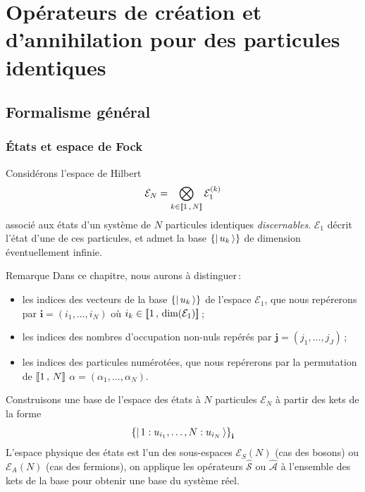 \section{Opérateurs de création et d’annihilation pour des particules identiques}

    \subsection{Formalisme général}

        

        \subsubsection{États et espace de Fock}

        Considérons l’espace de Hilbert 
        \[ \mathcal{E}_N = \bigotimes_{k \in \left[\!\left[ 1 \, , \, N \right]\!\right]} \mathcal{E}_1^{(k)} \]
        associé aux états d’un système de $N$ particules identiques \textit{discernables}. $\mathcal{E}_1$ décrit l’état d’une de ces particules, et admet la base $\left\{\left| \, u_k \, \right>\right\}$ de dimension éventuellement infinie.

        \begin{omed}{Remarque}
            Dans ce chapitre, nous aurons à distinguer :
            \begin{itemize}
                \item les indices des vecteurs de la base $\left\{\left| \, u_k \, \right>\right\}$ de l’espace $\mathcal{E}_1$, que nous repérerons par $\mathbf{i} = (i_1, \ldots, i_N)$ où $i_k \in \left[\!\left[ 1 \, , \, \text{dim}(\mathcal{E}_1) \right]\!\right]$ ;
                \item les indices des nombres d’occupation non-nuls repérés par $\mathbf{j} = (j_1, \ldots, j_J)$ ;
                \item les indices des particules numérotées, que nous repérerons par la permutation de $\left[\!\left[ 1 \, , \, N \right]\!\right]$ $\alpha = (\alpha_1, \ldots, \alpha_N)$.
            \end{itemize} 
        \end{omed}

        Construisons une base de l’espace des états à $N$ particules $\mathcal{E}_N$ à partir des kets de la forme 
        \[ \left\{\left| \, 1 : u_{i_1}, \ldots, N : u_{i_N} \, \right>\right\}_{\mathbf{i}} \]
        L’espace physique des états est l’un des sous-espaces $\mathcal{E}_S(N)$ (cas des bosons) ou $\mathcal{E}_{A}(N)$ (cas des fermions), on applique les opérateurs $\hat{\mathcal{S}}$ ou $\hat{\mathcal{A}}$ à l’ensemble des kets de la base  pour obtenir une base du système réel. 
        
